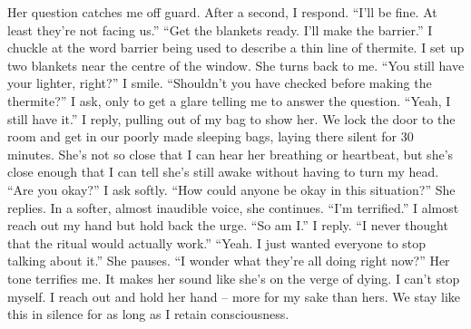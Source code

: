 \documentclass[a4paper, 12pt]{book}
\newcommand\tab[1][1cm]{\hspace*{#1}}
\begin{document}
\newline
\tab
Her question catches me off guard. After a second, I respond. “I’ll be fine. At least they’re not facing us.”
\newline
\tab
“Get the blankets ready. I’ll make the barrier.” I chuckle at the word barrier being used to describe a thin line of thermite. I set up two blankets near the centre of the window. She turns back to me. “You still have your lighter, right?”
\newline
\tab
I smile. “Shouldn’t you have checked before making the thermite?” I ask, only to get a glare telling me to answer the question. “Yeah, I still have it.” I reply, pulling out of my bag to show her.
\newline
\tab
We lock the door to the room and get in our poorly made sleeping bags, laying there silent for 30 minutes. She’s not so close that I can hear her breathing or heartbeat, but she’s close enough that I can tell she’s still awake without having to turn my head. “Are you okay?” I ask softly.
\newline
\tab
“How could anyone be okay in this situation?” She replies. In a softer, almost inaudible voice, she continues. “I’m terrified.”
\newline
\tab
I almost reach out my hand but hold back the urge. “So am I.” I reply. “I never thought that the ritual would actually work.”
\newline
\tab
“Yeah. I just wanted everyone to stop talking about it.” She pauses. “I wonder what they’re all doing right now?” Her tone terrifies me. It makes her sound like she’s on the verge of dying. I can’t stop myself. I reach out and hold her hand – more for my sake than hers. We stay like this in silence for as long as I retain consciousness.
\end{document}
